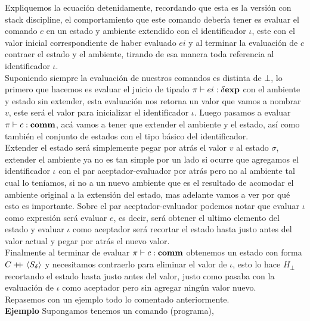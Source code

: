 \noindent
Expliquemos la ecuaci\'on detenidamente, recordando que esta es la versi\'on
con stack discipline, el comportamiento que este comando deber\'ia tener es evaluar
el comando $c$ en un estado y ambiente extendido con el identificador $\iota$, 
este con el valor inicial correspondiente de haber evaluado $ei$
y al terminar la evaluaci\'on de $c$ contraer el estado y el ambiente, tirando
de esa manera toda referencia al identificador $\iota$.\\

Suponiendo siempre la evaluaci\'on de nuestros comandos es distinta de $\bot$, 
lo primero que hacemos es evaluar el juicio de tipado $\pi \vdash ei : \delta \textbf{exp}$
con el ambiente y estado sin extender, esta evaluaci\'on nos retorna un valor
que vamos a nombrar $v$, este ser\'a el valor para inicializar el identificador $\iota$.
Luego pasamos a evaluar $\pi \vdash c : \textbf{comm}$, ac\'a vamos a tener que extender 
el ambiente y el estado, as\'i como tambi\'en el conjunto de estados con el tipo
b\'asico del identificador. \\
Extender el estado ser\'a simplemente pegar por atr\'as el valor $v$ al estado
$\sigma$, extender el ambiente ya no es tan simple por un lado si ocurre que 
agregamos el identificador $\iota$ con el par aceptador-evaluador por atr\'as
pero no al ambiente tal cual lo ten\'iamos, si no a un nuevo ambiente que es
el resultado de acomodar el ambiente original a la extensi\'on del estado, mas
adelante vamos a ver por qu\'e esto es importante. Sobre el par aceptador-evaluador
podemos notar que evaluar $\iota$ como expresi\'on ser\'a evaluar $e$, es decir,
ser\'a obtener el ultimo elemento del estado y evaluar $\iota$ como aceptador ser\'a
recortar el estado hasta justo antes del valor actual y pegar por atr\'as el nuevo
valor.\\
Finalmente al terminar de evaluar $\pi \vdash c : \textbf{comm}$ obtenemos un estado
con forma $C +\kern-1.3ex+\kern0.8ex \langle S_\delta \rangle$ y necesitamos contraerlo para eliminar
el valor de $\iota$, esto lo hace $H_\bot$ recortando el estado hasta justo antes
del valor, justo como pasaba con la evaluaci\'on de $\iota$ como aceptador pero
sin agregar ning\'un valor nuevo.\\

Repasemos con un ejemplo todo lo comentado anteriormente.\\

\noindent
\textbf{Ejemplo}
Supongamos tenemos un comando (programa),\\

